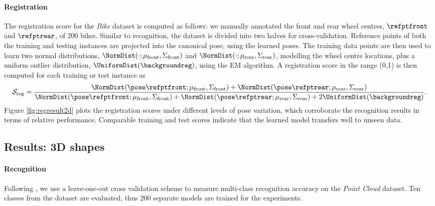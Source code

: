 \paragraph{Registration} 
The registration score for the \emph{Bike} dataset is computed as follows: we manually annotated the front and rear wheel centres, $\refptfront$ and $\refptrear$, of 200 bikes. Similar to recognition, the dataset is divided into two halves for cross-validation. Reference points of both the training and testing instances are projected into the canonical pose, using the learned poses. The training data points are then used to learn two normal distributions, $\NormDist(\cdot;\mu_\mathrm{front},\Sigma_\mathrm{front})$ and $\NormDist(\cdot;\mu_\mathrm{rear},\Sigma_\mathrm{rear})$, modelling the wheel centre locations, plus a uniform outlier distribution, $\UniformDist(\backgroundreg)$, using the EM algorithm. A registration score in the range (0,1) is then computed for each training or test instance as
\begin{equation}
\mathcal{S}_\mathrm{reg} = \frac{\NormDist(\pose\refptfront; \mu_\mathrm{front},\Sigma_\mathrm{front}) + \NormDist(\pose\refptrear; \mu_\mathrm{rear},\Sigma_\mathrm{rear})}{\NormDist(\pose\refptfront; \mu_\mathrm{front},\Sigma_\mathrm{front}) + \NormDist(\pose\refptrear; \mu_\mathrm{rear},\Sigma_\mathrm{rear}) + 2\UniformDist(\backgroundreg)}.
\label{eq:reg2d_score}
\end{equation}
Figure \ref{fig:regresult2d} plots the registration scores under different levels of pose variation, which corroborate the recognition results in terms of relative performance. Comparable training and test scores indicate that the learned model transfers well to unseen data.

\subsection{Results: 3D shapes}

\paragraph{Recognition}
Following \cite{Pham2011}, we use a leave-one-out cross validation scheme to measure multi-class recognition accuracy on the \emph{Point Cloud} dataset. 
Ten classes from the dataset are evaluated, thus 200 separate models are trained for the experiments.

